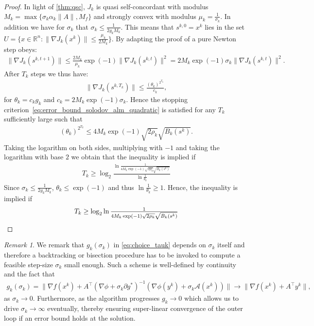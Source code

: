 \documentclass[11pt,onecolumn]{article}
\newcommand{\bR}{\mathbb{R}}
\theoremstyle{remark}
\newtheorem{remark}[remark]{Remark}
\begin{document}
\begin{proof}
In light of \cref{thm:qsc}, $J_k$ is quasi self-concordant with modulus $M_k=\max\{\sigma_k \alpha_k \|A\|, M_f\}$ and strongly convex with modulus $\mu_k=\frac{1}{\sigma_k}$.
In addition we have for $\sigma_k$ that
$
  \sigma_k \leq \frac{1}{2 g_k M_k}.
$
This means that $s^{k,0} = x^k$ lies in the set $U=\{x \in \bR^n : \|\nabla J_k(x^k)\| \leq \tfrac{\mu_k}{2M_k}\}$.
By adapting the proof of \cite[Theorem 8]{doikov2025minimizing} a pure Newton step obeys:
\begin{align} 
\|\nabla J_k(s^{k,t+1})\| \leq \tfrac{2M_k}{\mu_k}\exp(-1)\|\nabla J_k(s^{k,t})\|^2 = 2M_k\exp(-1) \sigma_k \|\nabla J_k(s^{k,t})\|^2.
\end{align}
After $T_k$ steps we thus have:
\begin{align} 
\|\nabla J_k(s^{k,T_k})\| \leq \frac{(\theta_k)^{2^{T_k}}}{c_k},
\end{align}
for $\theta_k =c_k g_k$ and $c_k=  2M_k\exp(-1) \sigma_k$.
Hence the stopping criterion~\cref{eq:error_bound_solodov_alm_quadratic} is satisfied for any $T_k$ sufficiently large such that
\begin{align}
    (\theta_k)^{2^{T_k}} \leq 4 M_k\exp(-1) \sqrt{2 \rho_k}\sqrt{B_k(s^k)}.
\end{align}
Taking the logarithm on both sides, multiplying with $-1$ and taking the logarithm with base $2$ we obtain that the inequality is implied if
\begin{align}
T_k\geq \log_2 \frac{\ln \tfrac{1}{4 M_k\exp(-1) \sqrt{2 \rho_k}\sqrt{B_k(s^k)}}}{\ln \tfrac{1}{\theta_k}}
\end{align}
Since $\sigma_k \leq \frac{1}{2 g_k M_k}$, $\theta_k\leq \exp(-1)$ and thus $\ln\frac1{\theta_k} \geq 1$. Hence, the inequality is implied if
\[
    T_k \geq \log_2  \ln \tfrac{1}{4 M_k\exp(-1) \sqrt{2 \rho_k}\sqrt{B_k(s^k)}} \qedhere
\]
\end{proof}
\begin{remark}
We remark that $g_k(\sigma_k)$ in \cref{eq:choice_tauk} depends on $\sigma_k$ itself and therefore a backtracking or bisection procedure has to be invoked to compute a feasible step-size $\sigma_k$ small enough. Such a scheme is well-defined by continuity and the fact that 
\begin{align}
g_k(\sigma_k)=\|\nabla f(x^k) + A^\top (\nabla \phi + \sigma_k \partial g^*)^{-1}(\nabla \phi(y^k) + \sigma_k \mathcal{A}(x^k))\| \to \|\nabla f(x^k) +A^\top y^k\|,
\end{align}
as $\sigma_k \to 0$.
Furthermore, as the algorithm progresses $g_k \to 0$ which allows us to drive $\sigma_k \to \infty$ eventually, thereby ensuring super-linear convergence of the outer loop if an error bound holds at the solution.
\end{remark}
\end{document}
